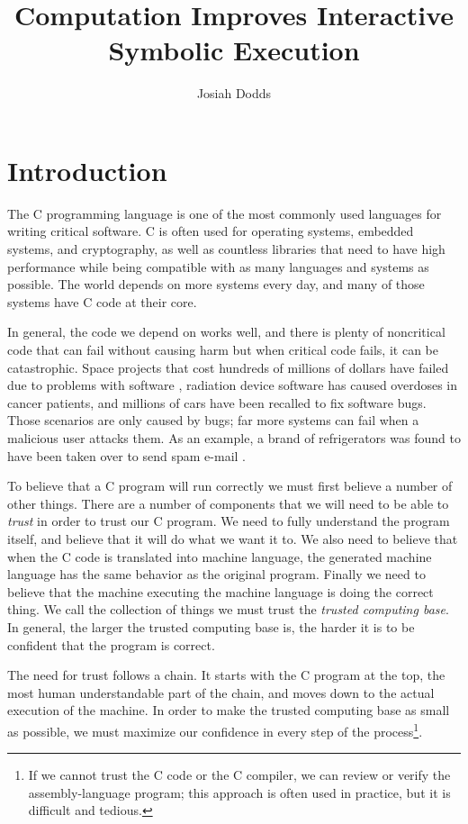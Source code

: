 \documentclass{puthesis}
\author{Josiah Dodds}
\title{Computation Improves Interactive Symbolic Execution}
\begin{document}
\chapter{Introduction}

The C programming language is one of the most commonly used languages
for writing critical software. C is often used for operating systems,
embedded systems, and cryptography, as well as countless libraries
that need to have high performance while being compatible with as many
languages and systems as possible. The world depends on more systems
every day, and many of those systems have C code at their core.

In general, the code we depend on works well, and there is plenty of
noncritical code that can fail without causing harm but when critical
code fails, it can be catastrophic. Space projects that cost hundreds
of millions of dollars have failed due to problems with software
\cite{polarlander, marsorbit}, radiation device software has caused
overdoses in cancer patients\cite{therac}, and millions of cars have
been recalled to fix software bugs\cite{toyotarecall}. Those scenarios
are only caused by bugs; far more systems can fail when a malicious
user attacks them. As an example, a brand of refrigerators was found
to have been taken over to send spam e-mail \cite{fridgenet}.

To believe that a C program will run correctly we must first believe a
number of other things. There are a number of components that we will
need to be able to \emph{trust} in order to trust our C program. We need
to fully understand the program itself, and believe that it will do
what we want it to. We also need to believe that when
the C code is translated into machine language, the generated machine
language has the same behavior as the original program. Finally we
need to believe that the machine executing the machine language is
doing the correct thing. We call the collection of things we must
trust the \emph{trusted computing base}. In general, the larger the
trusted computing base is, the harder it is to be confident that the
program is correct.

The need for trust follows a chain. It starts with the C program at
the top, the most human understandable part of the chain, and moves
down to the actual execution of the machine. In order to make the
trusted computing base as small as possible, we must maximize our
confidence in every step of the process\footnote{If we cannot trust
  the C code or the C compiler, we can review or verify the
  assembly-language program; this approach is often used in practice,
  but it is difficult and tedious.}.
\end{document}
